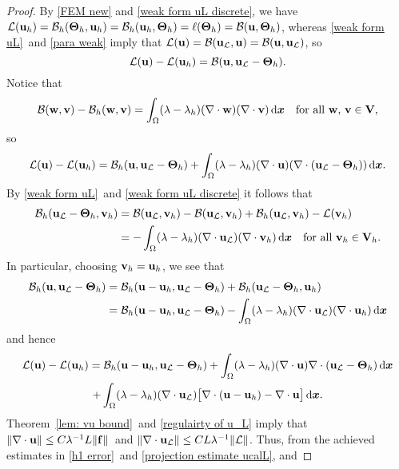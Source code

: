 \documentclass[11pt]{article}
\newcommand{\calB}{\mathcal{B}}
\newcommand{\calL}{\mathcal{L}}
\newcommand{\vf}{{\bf f}}
\newcommand{\vu}{{\bf u}}
\newcommand{\vv}{{\bf v}}
\newcommand{\vV}{{\bf V}}
\newcommand{\vw}{{\bf w}}
\newcommand{\bsx}{{\boldsymbol{x}}}
\numberwithin{equation}{section}
\newcommand{\ud}{\mathrm{d}}
\begin{document}
\begin{proof}
By \eqref{FEM new} and \eqref{weak form uL discrete}, we have
$\calL(\vu_h)=\calB_h(\mathbf{\Theta}_h,\vu_h)
=\calB_h(\vu_h,\mathbf{\Theta}_h)=\ell(\mathbf{\Theta}_h)
=\calB(\vu,\mathbf{\Theta}_h)$, whereas \eqref{weak form uL}~and
\eqref{para weak} imply that
$\calL(\vu)=\calB(\vu_{\calL},\vu)=\calB(\vu,\vu_{\calL})$, so
\[
\calL(\vu)-\calL(\vu_h)=\calB(\vu,\vu_{\calL}-\mathbf{\Theta}_h).
\]
Notice that
\[
\calB(\vw,\vv)-\calB_h(\vw,\vv)
    =\int_\Omega (\lambda-\lambda_h)(\nabla\cdot\vw)(\nabla\cdot\vv)\,\ud\bsx
    \quad\text{for all $\vw$, $\vv\in\vV$,}
\]
so
\[
\calL(\vu)-\calL(\vu_h)
    =\calB_h(\vu,\vu_{\calL}-{\bf\Theta}_h)
    +\int_{\Omega}(\lambda-\lambda_h)(\nabla\cdot\vu)
        (\nabla \cdot(\vu_{\calL}-\mathbf{\Theta}_h))\,\ud\bsx.
\]
By \eqref{weak form uL}~and \eqref{weak form uL discrete} it follows that
\begin{equation}\label{uL relation}
\begin{aligned}
\calB_h(\vu_{\calL}-{\bf\Theta}_h,\vv_h)&=\calB(\vu_{\calL},\vv_h)
   -\calB(\vu_{\calL},\vv_h)+\calB_h(\vu_{\calL},\vv_h)-\calL(\vv_h)\\
   &=-\int_{\Omega}(\lambda-\lambda_h)
    (\nabla\cdot\vu_{\calL})(\nabla\cdot\vv_h)\,\ud\bsx
    \quad\text{for all $\vv_h \in\vV_h$.}
\end{aligned}
\end{equation}
In particular, choosing $\vv_h=\vu_h$, we see that
\begin{align*}
\calB_h(\vu,\vu_{\calL}-\mathbf{\Theta}_h)
    &=\calB_h(\vu-\vu_h,\vu_{\calL}-\mathbf{\Theta}_h)
    +\calB_h(\vu_{\calL}-\mathbf{\Theta}_h,\vu_h)\\
    &=\calB_h(\vu-\vu_h,\vu_{\calL}-{\bf\Theta}_h)
    -\int_{\Omega} (\lambda-\lambda_h)
    (\nabla\cdot\vu_{\calL})(\nabla\cdot\vu_h)\,\ud\bsx
\end{align*}
and hence
\begin{multline}\label{change in lambda 2}
\calL(\vu)-\calL(\vu_h)
    =\calB_h(\vu-\vu_h,\vu_{\calL}-\mathbf{\Theta}_h)
+\int_{\Omega}(\lambda-\lambda_h)
    (\nabla\cdot\vu)\nabla\cdot(\vu_{\calL}-\mathbf{\Theta}_h)\,\ud\bsx\\
    +\int_{\Omega}(\lambda-\lambda_h)(\nabla\cdot\vu_{\calL})\bigl[
    \nabla\cdot(\vu-\vu_h)-\nabla\cdot\vu\bigr]\,\ud\bsx.
\end{multline}
Theorem~\ref{lem: vu bound}~and \eqref{regulairty of u_L} imply that
$\|\nabla\cdot\vu\|\le C\lambda^{-1}L\|\vf\|$~and
$\|\nabla\cdot\vu_{\calL}\|\le CL\lambda^{-1}\|\calL\|$. Thus, from the achieved
estimates in \eqref{h1 error}~and \eqref{projection estimate ucalL}, and

\end{proof}
\end{document}
